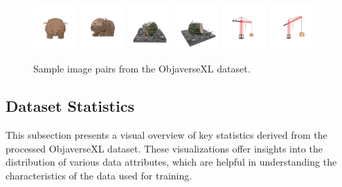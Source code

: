 \begin{figure}[htbp]
  \includegraphics[width=0.15\textwidth]{images/data/samples/22.1.jpeg}\hspace{0.01\textwidth}%
  \includegraphics[width=0.15\textwidth]{images/data/samples/22.2.jpeg}\hfill
  \includegraphics[width=0.15\textwidth]{images/data/samples/23.1.jpeg}\hspace{0.01\textwidth}%
  \includegraphics[width=0.15\textwidth]{images/data/samples/23.2.jpeg}\hfill
  \includegraphics[width=0.15\textwidth]{images/data/samples/24.1.jpeg}\hspace{0.01\textwidth}%
  \includegraphics[width=0.15\textwidth]{images/data/samples/24.2.jpeg}

  \caption{Sample image pairs from the ObjaverseXL dataset.}
  \label{fig:dataset-sample-pairs-1}
\end{figure}


\newpage

\subsection{Dataset Statistics}\label{ssec:dataset-statistics}
This subsection presents a visual overview of key statistics derived from the processed ObjaverseXL dataset. These visualizations offer insights into the distribution of various data attributes, which are helpful in understanding the characteristics of the data used for training.

